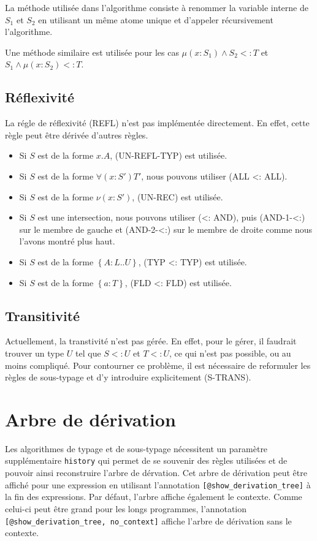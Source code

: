 La méthode utilisée dans l'algorithme consiste à renommer la variable interne de
$S_{1}$ et $S_{2}$ en utilisant un même atome unique et d'appeler récursivement l'algorithme.

Une méthode similaire est utilisée pour les cas $\mu(x : S_{1}) \wedge S_{2} <:
T$ et $S_{1} \wedge \mu(x : S_{2}) <: T$.

\subsection*{Réflexivité}

La régle de réflexivité (REFL) n'est pas implémentée directement. En effet,
cette règle peut être dérivée d'autres règles.

\begin{itemize}
  \item Si $S$ est de la forme $x.A$, (UN-REFL-TYP) est utilisée.
  \item Si $S$ est de la forme $\forall(x : S') T'$, nous pouvons utiliser (ALL
    <: ALL).
  \item Si $S$ est de la forme $\nu(x : S')$, (UN-REC) est utilisée.
  \item Si $S$ est une intersection, nous pouvons utiliser (<: AND), puis
    (AND-1-<:) sur le membre de gauche et (AND-2-<:) sur le membre de droite
    comme nous l'avons montré plus haut.
  \item Si $S$ est de la forme $\left\{ A : L .. U \right\}$, (TYP <: TYP) est utilisée.
  \item Si $S$ est de la forme $\left\{ a : T \right\}$, (FLD <: FLD) est utilisée.
\end{itemize}

\subsection*{Transitivité}

Actuellement, la transtivité n'est pas gérée. En effet, pour le gérer, il
faudrait trouver un type $U$ tel que $S <: U$ et $T <: U$, ce qui n'est pas
possible, ou au moins compliqué. Pour contourner ce problème, il est
nécessaire de reformuler les règles de sous-typage et d'y introduire
explicitement (S-TRANS).

\section{Arbre de dérivation}

Les algorithmes de typage et de sous-typage nécessitent un paramètre
supplémentaire \verb|history| qui permet de se souvenir des règles
utilisées et de pouvoir ainsi reconstruire l'arbre de dérvation. Cet arbre de
dérivation peut être affiché pour une expression en utilisant l'annotation
\verb|[@show_derivation_tree]| à la fin des expressions. Par défaut, l'arbre
affiche également le contexte. Comme celui-ci peut être grand pour les
longs programmes, l'annotation \\ \verb|[@show_derivation_tree, no_context]|
affiche l'arbre de dérivation sans le contexte.

